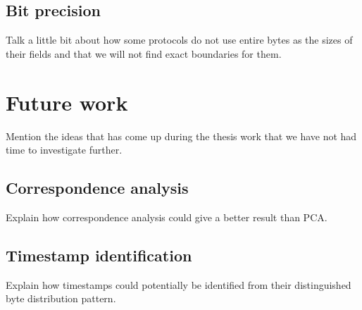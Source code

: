 \documentclass[a4paper]{report}
\begin{document}
\subsection{Bit precision}
Talk a little bit about how some protocols do not use entire bytes as the sizes
of their fields and that we will not find exact boundaries for them.

\section{Future work}
Mention the ideas that has come up during the thesis work that we have not had
time to investigate further.

\subsection{Correspondence analysis}
Explain how correspondence analysis could give a better result than PCA.

\subsection{Timestamp identification}
Explain how timestamps could potentially be identified from their distinguished
byte distribution pattern.



\end{document}
